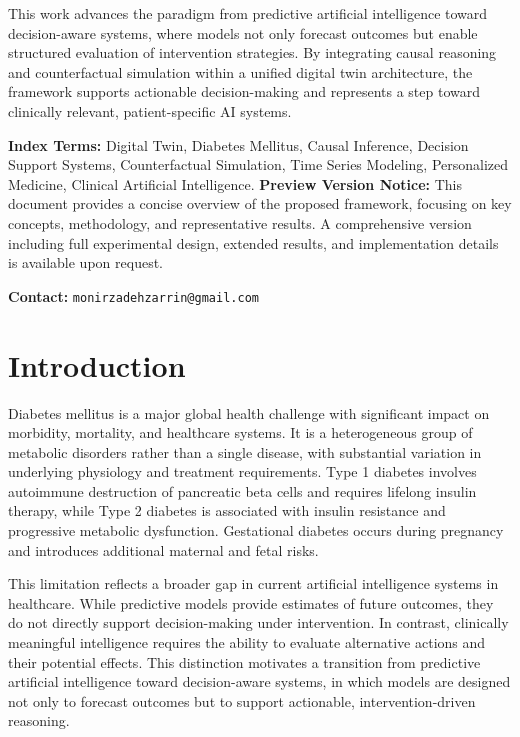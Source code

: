 \documentclass[journal]{IEEEtran}
\begin{document}
This work advances the paradigm from predictive artificial intelligence toward decision-aware systems, where models not only forecast outcomes but enable structured evaluation of intervention strategies. By integrating causal reasoning and counterfactual simulation within a unified digital twin architecture, the framework supports actionable decision-making and represents a step toward clinically relevant, patient-specific AI systems.

\vspace{0.6em}
\noindent\textbf{Index Terms:} Digital Twin, Diabetes Mellitus, Causal Inference, Decision Support Systems, Counterfactual Simulation, Time Series Modeling, Personalized Medicine, Clinical Artificial Intelligence.
\vspace{0.8em}
\noindent
\textbf{Preview Version Notice:}
This document provides a concise overview of the proposed framework, focusing on key concepts, methodology, and representative results. 
A comprehensive version including full experimental design, extended results, and implementation details is available upon request.

\vspace{0.3em}
\noindent
\textbf{Contact:} \texttt{monirzadehzarrin@gmail.com}
\section{Introduction}
Diabetes mellitus is a major global health challenge with significant impact on morbidity, mortality, and healthcare systems. It is a heterogeneous group of metabolic disorders rather than a single disease, with substantial variation in underlying physiology and treatment requirements. Type 1 diabetes involves autoimmune destruction of pancreatic beta cells and requires lifelong insulin therapy, while Type 2 diabetes is associated with insulin resistance and progressive metabolic dysfunction. Gestational diabetes occurs during pregnancy and introduces additional maternal and fetal risks.

This limitation reflects a broader gap in current artificial intelligence systems in healthcare. While predictive models provide estimates of future outcomes, they do not directly support decision-making under intervention. In contrast, clinically meaningful intelligence requires the ability to evaluate alternative actions and their potential effects. This distinction motivates a transition from predictive artificial intelligence toward decision-aware systems, in which models are designed not only to forecast outcomes but to support actionable, intervention-driven reasoning.
\end{document}

